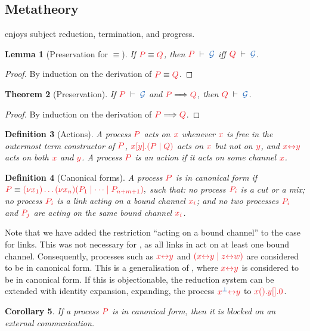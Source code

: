 \documentclass[copyright,creativecommons]{eptcs}
\newtheorem{lemma}{Lemma}[section]
\newtheorem{theorem}[lemma]{Theorem}
\newtheorem{corollary}[lemma]{Corollary}
\newtheorem{definition}[lemma]{Definition}
\begin{document}
\subsection{Metatheory}
\hcp enjoys subject reduction, termination, and progress.
\begin{lemma}[Preservation for $\equiv$]\label{lem:hcp-preservation-equiv}
  If $\tm{P}\equiv\tm{Q}$, then $\seq[P]{\mathcal{G}}$ iff $\seq[Q]{\mathcal{G}}$.
\end{lemma} 
\begin{proof}
  By induction on the derivation of $\tm{P}\equiv\tm{Q}$.
\end{proof}
\begin{theorem}[Preservation]\label{thm:hcp-preservation}
  If $\seq[P]{\mathcal{G}}$ and $\reducesto{P}{Q}$, then $\seq[Q]{\mathcal{G}}$.
\end{theorem} 
\begin{proof}
  By induction on the derivation of $\reducesto{P}{Q}$.
\end{proof}
\begin{definition}[Actions]
  A process $\tm{P}$ acts on $\tm{x}$ whenever $\tm{x}$ is free in the outermost
  term constructor of $\tm{P}$, \eg $\tm{\cpSend{x}{y}{P}{Q}}$ acts on $\tm{x}$
  but not on $\tm{y}$, and $\tm{\cpLink{x}{y}}$ acts on both $\tm{x}$ and $\tm{y}$.
  A process $\tm{P}$ is an action if it acts on some channel $\tm{x}$.
\end{definition}
\begin{definition}[Canonical forms]
  A process $\tm{P}$ is in canonical form if
 $
  \tm{P} \equiv \tm{\piNew{x_1}{\dots\piNew{x_n}{(P_1 \mid \dots \mid P_{n+m+1})}}},
  $
  such that: no process $\tm{P_i}$ is a cut or a mix; no process $\tm{P_i}$ is a link acting on a bound channel $\tm{x_i}$; and no two processes $\tm{P_i}$ and $\tm{P_j}$ are acting on the same bound channel $\tm{x_i}$.
\end{definition}
Note that we have added the restriction ``acting on a bound channel'' to the case for links. This was not necessary for \cp, as all links in \cp act on at least one bound channel. Consequently, processes such as $\tm{\cpLink{x}{y}}$ and $\tm{(\piPar{\cpLink{x}{y}}{\cpLink{z}{w}})}$ are considered to be in canonical form. This is a generalisation of \cp, where $\tm{\cpLink{x}{y}}$ is considered to be in canonical form. If this is objectionable, the reduction system can be extended with identity expansion, expanding, \eg the process $\tm{\cpLink{x^{\ty{\bot}}}{y}}$ to $\tm{\cpWait{x}{\cpHalt{y}}}$.
\begin{corollary}
  If a process $\tm{P}$ is in canonical form, then it is blocked on an external communication.
\end{corollary}
\end{document}

